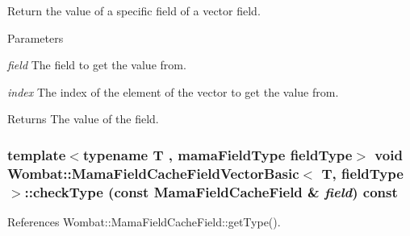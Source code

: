 Return the value of a specific field of a vector field. 
\begin{DoxyParams}{Parameters}
\item[{\em field}]The field to get the value from. \item[{\em index}]The index of the element of the vector to get the value from. \end{DoxyParams}
\begin{DoxyReturn}{Returns}
The value of the field. 
\end{DoxyReturn}
\hypertarget{classWombat_1_1MamaFieldCacheFieldVectorBasic_a588126cf850857ebd49ccb66138ca4ab}{
\subsubsection[{checkType}]{\setlength{\rightskip}{0pt plus 5cm}template$<$typename T , mamaFieldType fieldType$>$ void {\bf Wombat::MamaFieldCacheFieldVectorBasic}$<$ T, fieldType $>$::checkType (const {\bf MamaFieldCacheField} \& {\em field}) const}}
\label{classWombat_1_1MamaFieldCacheFieldVectorBasic_a588126cf850857ebd49ccb66138ca4ab}


References Wombat::MamaFieldCacheField::getType().